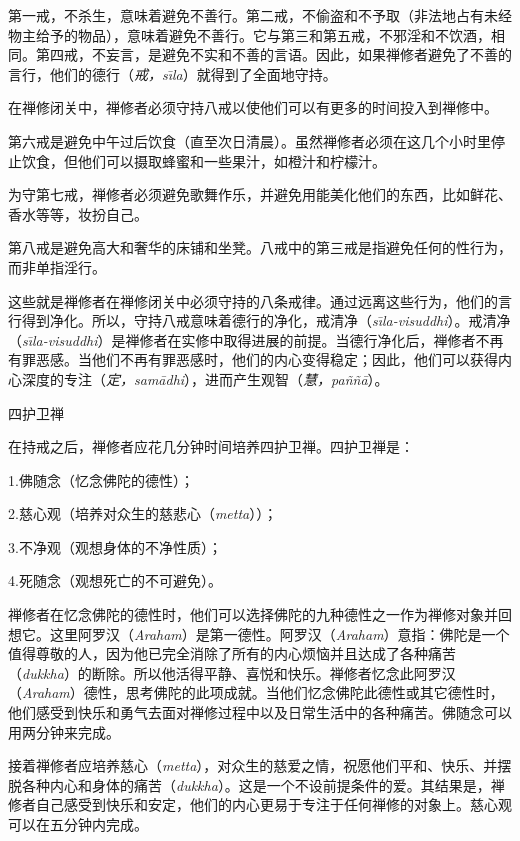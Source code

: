 第一戒，不杀生，意味着避免不善行。第二戒，不偷盗和不予取（非法地占有未经物主给予的物品），意味着避免不善行。它与第三和第五戒，不\1邪淫和不饮酒，相同。第四戒，不妄言，是避免不实和不善的言语。因此，如果禅修者避免了不善的言行，他们的德行（{\it 戒，s\=\i la}）就得到了全面地守持。

在禅修闭关中，禅修者必须守持八戒以使他们可以有更多的时间投入到禅修中。

第六戒是避免中午过后饮食（直至次日清晨）。虽然禅修者必须在这几个小时里停止饮食，但他们可以摄取蜂蜜和一些果汁，如橙汁和柠檬汁。

为守第七戒，禅修者必须避免歌舞作乐，并避免用能美化他们的东西，比如鲜花、香水等等，妆扮自己。

第八戒是避免高大和奢华的床铺和坐凳。八戒中的第三戒是指避免任何的性行为，而非单指淫行。

这些就是禅修者在禅修闭关中必须守持的八条戒律。通过远离这些行为，他们的言行得到净化。所以，守持八戒意味着德行的净化，戒清净（{\it s\=\i la-visuddhi}）。戒清净（{\it s\=\i la-visuddhi}）是禅修者在实修中取得进展的前提。当德行净化后，禅修者不再有罪恶感。当他们不再有罪恶感时，他们的内心变得稳定；因此，他们可以获得内心深度的专注（{\it 定，sam\=adhi}），进而产生观智（{\it 慧，pa\~n\~n\=a}）。

\sssubsectnonb \1四护卫禅

在持戒之后，禅修者应花几分钟时间培养四护卫禅。四护卫禅是：

{
\leftskip=1.6pc
\item{1.}佛随念（忆念佛陀的德性）；
\item{2.}慈心观（培养对众生的慈悲心（{\it metta}））；
\item{3.}不净观（观想身体的不净性质）；
\item{4.}死随念（观想死亡的不可避免）。

}

禅修者在忆念佛陀的德性时，他们可以选择佛陀的九种德性之一作为禅修对象并回想它。这里阿罗汉（{\it Araham}）是第一德性。阿罗汉（{\it Araham}）意指：佛陀是一个值得尊敬的人，因为他已完全消除了所有的内心烦恼并且达成了各种痛苦（{\it dukkha}）的断除。所以他活得平静、喜悦和快乐。禅修者忆念此阿罗汉（{\it Araham}）德性，思考佛陀的此项成就。当他们忆念佛陀此德性或其它德性时，他们感受到快乐和勇气去面对禅修过程中以及日常生活中的各种痛苦。佛随念可以用两分钟来完成。

接着禅修者应培养慈心（{\it metta}），对众生的慈爱之情，祝愿他们平和、快乐、并摆脱各种内心和身体的痛苦（{\it dukkha}）。这是一个不设前提条件的爱。其结果是，禅修者自己感受到快乐和安定，他们的内心更易于专注于任何禅修的对象上。慈心观可以在五分钟内完成。

